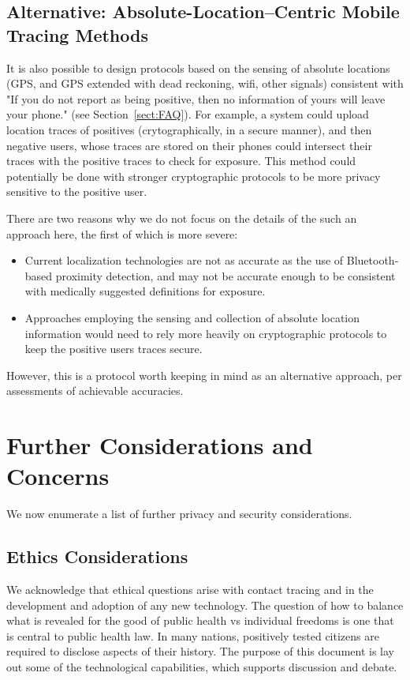 \documentclass{article}
\begin{document}
\subsection{Alternative: Absolute-Location--Centric Mobile Tracing Methods}\label{sect:GPS}
It is also possible to design protocols based on the sensing of absolute locations (GPS, and GPS extended with dead reckoning, wifi, other signals) consistent with "If you do not report as being positive, then no information of yours will leave your phone." (see Section~\ref{sect:FAQ}).  For example, a system could upload location traces of positives (crytographically, in a secure manner), and then negative users, whose traces are stored on their phones could intersect their traces with the positive traces to check for exposure. This method could potentially be done with stronger cryptographic protocols to be more privacy sensitive to the positive user.

There are two reasons why we do not focus on the details of the such an approach here, the first of which is more severe:
\begin{itemize}
    \item Current localization technologies are not as accurate as the use of Bluetooth-based proximity detection, and may not be accurate enough to be consistent with medically suggested definitions for exposure.
    \item Approaches employing the sensing and collection of absolute location information would need to rely more heavily on cryptographic protocols to keep the positive users traces secure.
\end{itemize}
However, this is a protocol worth keeping in mind as an alternative approach, per assessments of achievable accuracies.

\section{Further Considerations and Concerns}
We now enumerate a list of further privacy and security considerations.

\subsection{Ethics Considerations}
We acknowledge that ethical questions arise with contact tracing and in the development and adoption of any new technology. The question of how to balance what is revealed for the good of public health vs individual freedoms is one that is central to public health law. In many nations, positively tested citizens are required to disclose aspects of their history.  The purpose of this document is lay out some of the technological capabilities, which supports discussion and debate.
\end{document}
